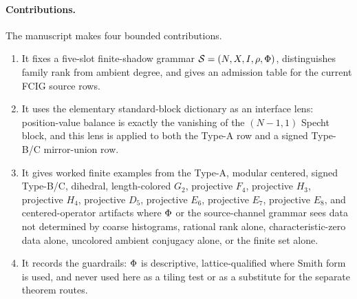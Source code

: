 \paragraph{Contributions.}
The manuscript makes four bounded contributions.
\begin{enumerate}[label=\textup{(\roman*)},leftmargin=*]
  \item It fixes a five-slot finite-shadow grammar \(\mathcal S=(N,X,I,\rho,\Phi)\), distinguishes family rank from ambient degree, and gives an admission table for the current FCIG source rows.
  \item It uses the elementary standard-block dictionary as an interface lens: position-value balance is exactly the vanishing of the \((N-1,1)\) Specht block, and this lens is applied to both the Type-A row and a signed Type-B/C mirror-union row.
  \item It gives worked finite examples from the Type-A, modular centered, signed Type-B/C, dihedral, length-colored \(G_2\), projective \(F_4\), projective \(H_3\), projective \(H_4\), projective \(D_5\), projective \(E_6\), projective \(E_7\), projective \(E_8\), and centered-operator artifacts where \(\Phi\) or the source-channel grammar sees data not determined by coarse histograms, rational rank alone, characteristic-zero data alone, uncolored ambient conjugacy alone, or the finite set alone.
  \item It records the guardrails: \(\Phi\) is descriptive, lattice-qualified where Smith form is used, and never used here as a tiling test or as a substitute for the separate theorem routes.
\end{enumerate}